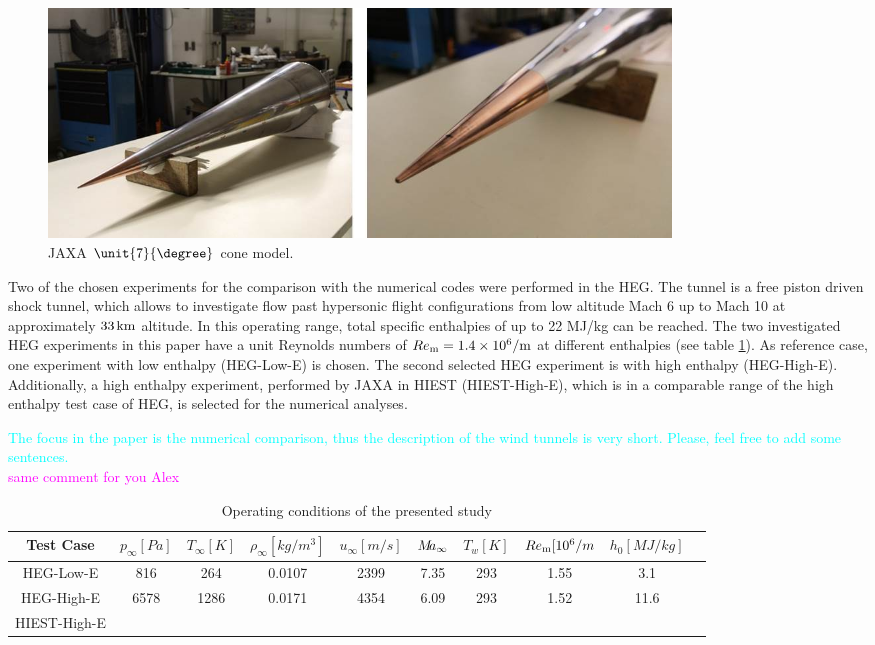 \documentclass[]{aiaa-tc}%
\begin{document}
\begin{figure}[htbp]
	\centering
\includegraphics[width=0.8\textwidth]{pics/2018_cone_model.jpg}
	\caption{JAXA $\unit{7}{\degree}$ cone model.}
	\label{fig:cone_model}
\end{figure}

Two of the chosen experiments for the comparison with the numerical codes were performed in the HEG. The tunnel is a free piston driven shock tunnel, which allows to investigate flow past hypersonic flight configurations from low altitude Mach 6 up to Mach 10 at approximately $33 \hspace{0.05cm} \rm km$ altitude. In this operating range, total specific enthalpies of up to 22 MJ/kg can be reached.\cite{Hannemann_2008} The two investigated HEG experiments in this paper have a unit Reynolds numbers of $Re_{\rm m} = 1.4 \times 10^6 / \rm m$ at different enthalpies (see table \ref{tab:test_cases}). As reference case, one experiment with low enthalpy (HEG-Low-E) is chosen. The second selected HEG experiment is with high enthalpy (HEG-High-E). Additionally, a high enthalpy experiment, performed by JAXA in HIEST (HIEST-High-E), which is in a comparable range of the high enthalpy test case of HEG, is selected for the numerical analyses.

\textcolor{cyan}{The focus in the paper is the numerical comparison, thus the description of the wind tunnels is very short. Please, feel free to add some sentences.}\\
\textcolor{magenta}{same comment for you Alex}

\begin{table}[htbp]
	\centering
\begin{tabular}{c||c|c|c|c|c|c|c|c|c}%
 Test Case & $p_{\infty} [Pa] $&  $T_{\infty} [K] $  & $\rho_{\infty} [kg/m^3] $ & $u_{\infty} [m/s]$ & $M\hspace{-0.08cm}a_{\infty}$ & $T_w [K] $ & $Re_{\rm m} [10^6/m$ & $h_0 [MJ/kg]$ \\
\hline
\hline
\hspace{0.15cm} HEG-Low-E& \hspace{0.08cm} 816 & \hspace{0.08cm} 264 & 0.0107 &  2399 & 7.35   & 293 & 1.55 &\hspace{0.08cm} 3.1\\
\hline
\hspace{0.15cm} HEG-High-E& 6578  & 1286  & 0.0171 &  4354 &  6.09      & 293 & 1.52 & 11.6\\
\hline
HIEST-High-E&   &   &      & &  & & & \\
\end{tabular}
	\caption{Operating conditions of the presented study}
	\label{tab:test_cases}
\end{table}
\end{document}
